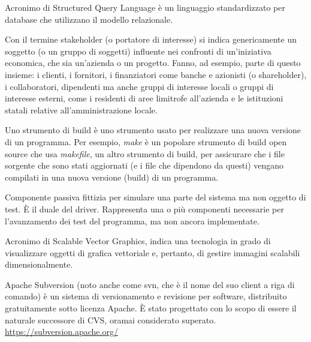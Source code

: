 Acronimo di Structured Query Language è un linguaggio standardizzato per database che utilizzano il modello relazionale.

Con il termine stakeholder (o portatore di interesse) si indica genericamente un soggetto (o un gruppo di soggetti) influente nei confronti di un'iniziativa economica, che sia un'azienda o un progetto.
Fanno, ad esempio, parte di questo insieme: i clienti, i fornitori, i finanziatori come banche e azionisti (o shareholder), i collaboratori, dipendenti ma anche gruppi di interesse locali o gruppi di interesse esterni, come i residenti di aree limitrofe all'azienda e le istituzioni statali relative all'amministrazione locale.

Uno strumento di build è uno strumento usato per realizzare una nuova versione di un programma. Per esempio, \textit{make} è un popolare strumento di build open source che usa \textit{makefile}, un altro strumento di build, per assicurare che i file sorgente che sono stati aggiornati (e i file che dipendono da questi) vengano compilati in una nuova versione (build) di un programma.

Componente passiva fittizia per simulare una parte del sistema ma non oggetto di test. \`{E} il duale del driver. Rappresenta una o più componenti necessarie per l’avanzamento dei test del programma, ma non ancora implementate.

Acronimo di Scalable Vector Graphics, indica una tecnologia in grado di visualizzare oggetti di grafica vettoriale e, pertanto, di gestire immagini scalabili dimensionalmente.

Apache Subversion (noto anche come svn, che è il nome del suo client a riga di comando) è un sistema di versionamento e revisione per software, distribuito gratuitamente sotto licenza Apache. \`{E} stato progettato con lo scopo di essere il naturale successore di CVS, oramai considerato superato.\\
\url{https://subversion.apache.org/}
\clearpage
